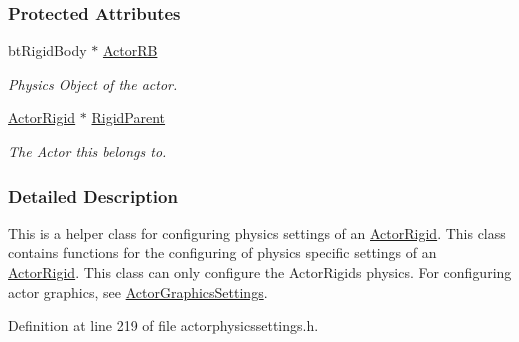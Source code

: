 \subsubsection*{Protected Attributes}
\begin{DoxyCompactItemize}
\item 
\hypertarget{classphys_1_1ActorRigidPhysicsSettings_af92d6c9108279828425390b02612861f}{
btRigidBody $\ast$ \hyperlink{classphys_1_1ActorRigidPhysicsSettings_af92d6c9108279828425390b02612861f}{ActorRB}}
\label{classphys_1_1ActorRigidPhysicsSettings_af92d6c9108279828425390b02612861f}

\begin{DoxyCompactList}\small\item\em Physics Object of the actor. \item\end{DoxyCompactList}\item 
\hypertarget{classphys_1_1ActorRigidPhysicsSettings_a8fe8b3e8632c9ae82fdd091f9628690b}{
\hyperlink{classphys_1_1ActorRigid}{ActorRigid} $\ast$ \hyperlink{classphys_1_1ActorRigidPhysicsSettings_a8fe8b3e8632c9ae82fdd091f9628690b}{RigidParent}}
\label{classphys_1_1ActorRigidPhysicsSettings_a8fe8b3e8632c9ae82fdd091f9628690b}

\begin{DoxyCompactList}\small\item\em The Actor this belongs to. \item\end{DoxyCompactList}\end{DoxyCompactItemize}


\subsubsection{Detailed Description}
This is a helper class for configuring physics settings of an \hyperlink{classphys_1_1ActorRigid}{ActorRigid}. This class contains functions for the configuring of physics specific settings of an \hyperlink{classphys_1_1ActorRigid}{ActorRigid}. This class can only configure the ActorRigids physics. For configuring actor graphics, see \hyperlink{classphys_1_1ActorGraphicsSettings}{ActorGraphicsSettings}. 

Definition at line 219 of file actorphysicssettings.h.



